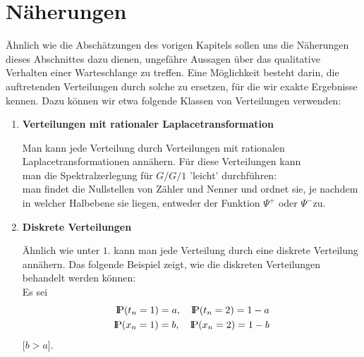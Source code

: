 \section{Näherungen}
\bigskip
Ähnlich wie die Abschätzungen des vorigen Kapitels sollen uns die Näherungen dieses Abschnittes dazu dienen, ungefähre Aussagen über das qualitative
Verhalten einer Warteschlange zu treffen. Eine Möglichkeit besteht darin, die auftretenden Verteilungen durch solche zu ersetzen, für die wir exakte Ergebnisse
kennen. Dazu können wir etwa folgende Klassen von Verteilungen verwenden:
\begin{enumerate}

\item {\bf Verteilungen mit rationaler Laplacetransformation}

Man kann jede Verteilung durch Verteilungen mit rationalen Laplacetransformationen annähern. Für diese Verteilungen kann \\
 man die Spektralzerlegung für $G/G/1$ 'leicht' durchführen: \\
man findet die Nullstellen von Zähler und Nenner und ordnet sie, je nachdem in welcher Halbebene sie liegen, entweder
der Funktion $\Psi^{+}$ oder $\Psi^{-}$zu.

\item {\bf Diskrete Verteilungen}

Ähnlich wie unter $1.$ kann man jede Verteilung durch eine diskrete Verteilung annähern. Das folgende Beispiel zeigt, wie die diskreten Verteilungen behandelt
werden können:\\
Es sei
\begin{eqnarray*}
  {\rm I\kern-0.2em P}(t_{n}=1)=a, \quad {\rm I\kern-0.2em P}(t_{n}=2)=1-a \\
  {\rm I\kern-0.2em P}(x_{n}=1)=b, \quad {\rm I\kern-0.2em P}(x_{n}=2)=1-b
\end{eqnarray*}
[$b>a$].


\end{enumerate}
